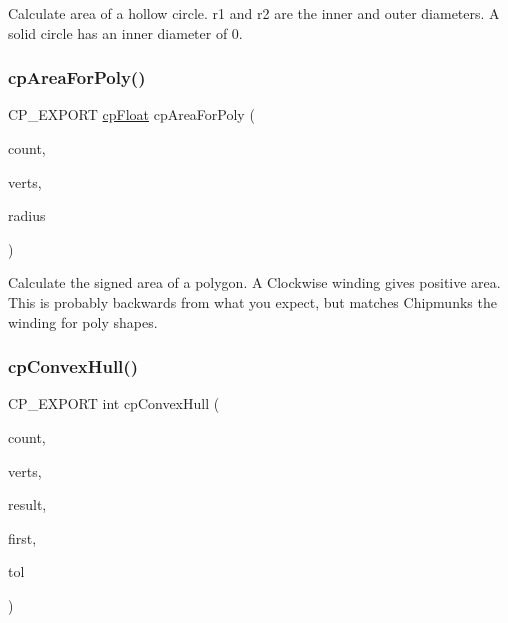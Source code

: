 Calculate area of a hollow circle. {\ttfamily r1} and {\ttfamily r2} are the inner and outer diameters. A solid circle has an inner diameter of 0. \mbox{\label{group__misc_ga2bc17e58f105411e2d66c09f8047d822}} 
\subsubsection{\texorpdfstring{cp\+Area\+For\+Poly()}{cpAreaForPoly()}}
{\footnotesize\ttfamily C\+P\+\_\+\+E\+X\+P\+O\+RT \mbox{\hyperlink{group__basic_types_gac1ed65573e035bf892505768c852d8d3}{cp\+Float}} cp\+Area\+For\+Poly (\begin{DoxyParamCaption}\item[{const int}]{count,  }\item[{const \mbox{\hyperlink{structcp_vect}{cp\+Vect}} $\ast$}]{verts,  }\item[{\mbox{\hyperlink{group__basic_types_gac1ed65573e035bf892505768c852d8d3}{cp\+Float}}}]{radius }\end{DoxyParamCaption})}

Calculate the signed area of a polygon. A Clockwise winding gives positive area. This is probably backwards from what you expect, but matches Chipmunk\textquotesingle{}s the winding for poly shapes. \mbox{\label{group__misc_ga94ed1fc4d2c987c3e4df3cb16b12a156}} 
\subsubsection{\texorpdfstring{cp\+Convex\+Hull()}{cpConvexHull()}}
{\footnotesize\ttfamily C\+P\+\_\+\+E\+X\+P\+O\+RT int cp\+Convex\+Hull (\begin{DoxyParamCaption}\item[{int}]{count,  }\item[{const \mbox{\hyperlink{structcp_vect}{cp\+Vect}} $\ast$}]{verts,  }\item[{\mbox{\hyperlink{structcp_vect}{cp\+Vect}} $\ast$}]{result,  }\item[{int $\ast$}]{first,  }\item[{\mbox{\hyperlink{group__basic_types_gac1ed65573e035bf892505768c852d8d3}{cp\+Float}}}]{tol }\end{DoxyParamCaption})}

